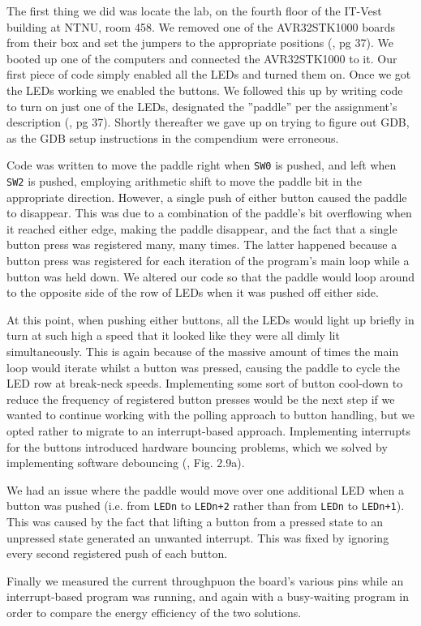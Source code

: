 The first thing we did was locate the lab, on the fourth floor of the IT-Vest building at NTNU, room 458. 
We removed one of the AVR32STK1000 boards from their box and set the jumpers to the appropriate positions (\cite{lab-compendium}, pg 37).
We booted up one of the computers and connected the AVR32STK1000 to it. 
Our first piece of code simply enabled all the LEDs and turned them on. Once we got the LEDs working we enabled the buttons.
We followed this up by writing code to turn on just one of the LEDs, designated the ''paddle'' per the assignment's description (\cite{lab-compendium}, pg 37).
Shortly thereafter we gave up on trying to figure out GDB, as the GDB setup instructions in the compendium \cite{compendium} were erroneous.

Code was written to move the paddle right when \texttt{SW0} is pushed, and left when \texttt{SW2} is pushed, employing arithmetic shift to move the paddle bit in the appropriate direction.
However, a single push of either button caused the paddle to disappear.
This was due to a combination of the paddle's bit overflowing when it reached either edge, making the paddle disappear, and the fact that a single button press was registered many, many times.
The latter happened because a button press was registered for each iteration of the program's main loop while a button was held down.
We altered our code so that the paddle would loop around to the opposite side of the row of LEDs when it was pushed off either side.

At this point, when pushing either buttons, all the LEDs would light up briefly in turn at such high a speed that it looked like they were all dimly lit simultaneously.
This is again because of the massive amount of times the main loop would iterate whilst a button was pressed, causing the paddle to cycle the LED row at break-neck speeds.
Implementing some sort of button cool-down to reduce the frequency of registered button presses would be the next step if we wanted to continue working with the polling approach to button handling, but we opted rather to migrate to an interrupt-based approach.
Implementing interrupts for the buttons introduced hardware bouncing problems, which we solved by implementing software debouncing (\cite{lab-compendium}, Fig. 2.9a).

We had an issue where the paddle would move over one additional LED when a button was pushed (i.e. from \texttt{LEDn} to \texttt{LEDn+2} rather than from \texttt{LEDn} to \texttt{LEDn+1}).
This was caused by the fact that lifting a button from a pressed state to an unpressed state generated an unwanted interrupt.
This was fixed by ignoring every second registered push of each button.

Finally we measured the current throughpuon the board's various pins while an interrupt-based program was running, and again with a busy-waiting program in order to compare the energy efficiency of the two solutions.
